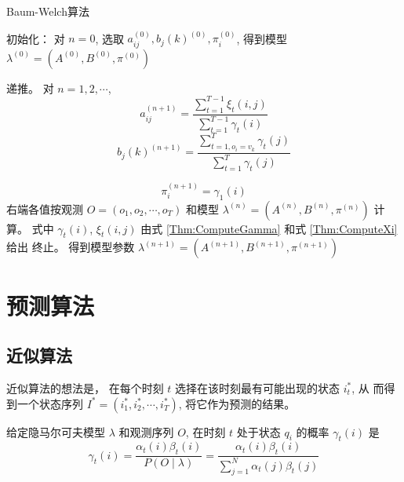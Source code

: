 \begin{algorithm}[htbp]
    \caption{Baum-Welch算法}


    初始化：
对 $ n=0 $, 选取 $ a_{i j}^{(0)}, b_{j}(k)^{(0)}, \pi_{i}^{(0)} $, 得到模型 $ \lambda^{(0)}=\left(A^{(0)}, B^{(0)}, \pi^{(0)}\right) $\;

递推。 对 $ n=1,2, \cdots $,
\begin{equation}
a_{i j}^{(n+1)}=\frac{\sum_{t=1}^{T-1} \xi_{t}(i, j)}{\sum_{t=1}^{T-1} \gamma_{t}(i)}
\end{equation}
\begin{equation} b_{j}(k)^{(n+1)}=\frac{\sum_{t=1, o_{i}=v_{k}}^{T} \gamma_{t}(j)}{\sum_{t=1}^{T} \gamma_{t}(j)} \end{equation}

\begin{equation} \pi_{i}^{(n+1)}=\gamma_{1}(i) \end{equation}
右端各值按观测 $ O=\left(o_{1}, o_{2}, \cdots, o_{T}\right) $ 和模型 $ \lambda^{(n)}=\left(A^{(n)}, B^{(n)}, \pi^{(n)}\right) $ 计算。 式中 $ \gamma_{t}(i) $, $ \xi_{t}(i, j) $ 由式 \ref{Thm:ComputeGamma} 和式 \ref{Thm:ComputeXi}  给出\;
终止。 得到模型参数 $ \lambda^{(n+1)}=\left(A^{(n+1)}, B^{(n+1)}, \pi^{(n+1)}\right) $
\end{algorithm}

\section{预测算法}

\subsection{近似算法}

近似算法的想法是， 在每个时刻 $ t $ 选择在该时刻最有可能出现的状态 $ i_{t}^{*} $, 从 而得到一个状态序列 $ I^{*}=\left(i_{1}^{*}, i_{2}^{*}, \cdots, i_{T}^{*}\right) $, 将它作为预测的结果。

给定隐马尔可夫模型 $ \lambda $ 和观测序列 $ O $, 在时刻 $ t $ 处于状态 $ q_{i} $ 的概率 $ \gamma_{t}(i) $ 是
\begin{equation}
\gamma_{t}(i)=\frac{\alpha_{t}(i) \beta_{t}(i)}{P(O \mid \lambda)}=\frac{\alpha_{t}(i) \beta_{t}(i)}{\sum_{j=1}^{N} \alpha_{t}(j) \beta_{t}(j)}
\end{equation}

